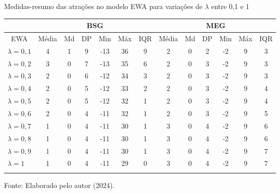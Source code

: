 \begin{tabela}[H]
	\small
	\centering
	\caption{Medidas-resumo das atrações no modelo EWA para variações de $\lambda$ entre 0,1 e 1}
	\begin{tabular}{l|c c c c c c|c c c c c c}
		\Xhline{2\arrayrulewidth}
		& \multicolumn{6}{c|}{BSG} & \multicolumn{6}{c}{MEG} \\ \hline
		\multicolumn{1}{c|}{EWA} & Média & Md & DP & Min & Máx & IQR & Média & Md & DP & Min & Máx & IQR \\ \hline
		$\lambda = 0,1$ & 4 & 1 & 9 & -13 & 36 & 9 & 2 & 0 & 2 & -2 & 9 & 3 \\
		$\lambda = 0,2$ & 3 & 0 & 7 & -13 & 35 & 6 & 2 & 0 & 3 & -2 & 9 & 3 \\
		$\lambda = 0,3$ & 2 & 0 & 6 & -12 & 34 & 3 & 2 & 0 & 3 & -2 & 9 & 3 \\
		$\lambda = 0,4$ & 2 & 0 & 5 & -12 & 33 & 2 & 2 & 0 & 3 & -2 & 9 & 4 \\
		$\lambda = 0,5$ & 2 & 0 & 5 & -12 & 32 & 1 & 2 & 0 & 3 & -2 & 9 & 4 \\
		$\lambda = 0,6$ & 2 & 0 & 4 & -11 & 32 & 1 & 2 & 0 & 3 & -2 & 9 & 5 \\
		$\lambda = 0,7$ & 1 & 0 & 4 & -11 & 30 & 1 & 3 & 0 & 4 & -2 & 9 & 6 \\
		$\lambda = 0,8$ & 1 & 0 & 4 & -11 & 30 & 1 & 3 & 0 & 4 & -2 & 9 & 6 \\
		$\lambda = 0,9$ & 1 & 0 & 4 & -11 & 30 & 1 & 3 & 0 & 4 & -2 & 9 & 7 \\
		$\lambda = 1$ & 1 & 0 & 4 & -11 & 29 & 0 & 3 & 0 & 4 & -2 & 9 & 7 \\
		\Xhline{2\arrayrulewidth}
	\end{tabular}
	\label{tabela_4}
	\caption*{\fontsize{10}{12}\selectfont Fonte: Elaborado pelo autor (2024).}
\end{tabela}
